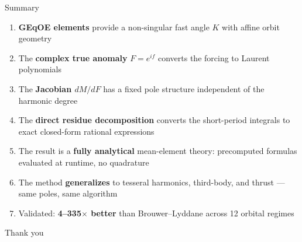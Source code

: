 \documentclass[aspectratio=169, 11pt]{beamer}
\begin{document}
\begin{frame}{Summary}

\begin{enumerate}
    \setlength{\itemsep}{0.4em}

    \item \textbf{GEqOE elements} provide a non-singular fast angle $K$
    with affine orbit geometry

    \item The \textbf{complex true anomaly} $F = e^{if}$ converts the
    forcing to Laurent polynomials

    \item The \textbf{Jacobian $dM/dF$} has a fixed pole structure
    independent of the harmonic degree

    \item The \textbf{direct residue decomposition} converts the
    short-period integrals to exact closed-form rational expressions

    \item The result is a \textbf{fully analytical} mean-element theory:
    precomputed formulas evaluated at runtime, no quadrature

    \item The method \textbf{generalizes} to tesseral harmonics,
    third-body, and thrust --- same poles, same algorithm

    \item Validated: \textbf{4--335$\times$ better} than
    Brouwer--Lyddane across 12 orbital regimes
\end{enumerate}

\end{frame}

\appendix
\begin{frame}[standout]
    Thank you
\end{frame}
\end{document}

